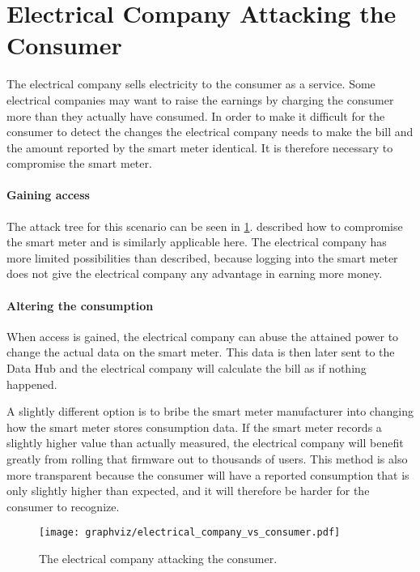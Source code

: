 \section{Electrical Company Attacking the Consumer}
The electrical company sells electricity to the consumer as a service.
Some electrical companies may want to raise the earnings by charging the consumer more than they actually have consumed.
In order to make it difficult for the consumer to detect the changes the electrical company needs to make the bill and the amount reported by the smart meter identical.
It is therefore necessary to compromise the smart meter.

\paragraph{Gaining access}
The attack tree for this scenario can be seen in \cref{electrical_vs_consumer}.
 described how to compromise the smart meter and is similarly applicable here.
The electrical company has more limited possibilities than described, because logging into the smart meter does not give the electrical company any advantage in earning more money.

\paragraph{Altering the consumption}
When access is gained, the electrical company can abuse the attained power to change the actual data on the smart meter.
This data is then later sent to the Data Hub and the electrical company will calculate the bill as if nothing happened.

A slightly different option is to bribe the smart meter manufacturer into changing how the smart meter stores consumption data.
If the smart meter records a slightly higher value than actually measured, the electrical company will benefit greatly from rolling that firmware out to thousands of users.
This method is also more transparent because the consumer will have a reported consumption that is only slightly higher than expected, and it will therefore be harder for the consumer to recognize.

\begin{figure}
  \begin{center}
    \texttt{[image: graphviz/electrical\_company\_vs\_consumer.pdf]}
  \end{center}
  \caption{The electrical company attacking the consumer.}
  \label{electrical_vs_consumer}
\end{figure}

